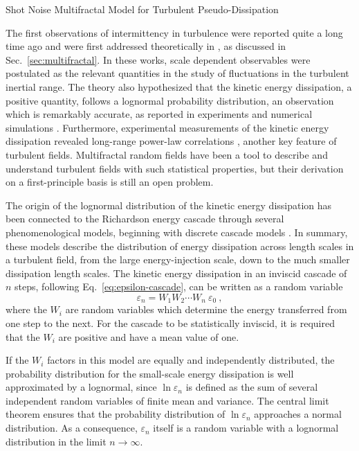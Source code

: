 \begin{chapter}{Shot Noise Multifractal Model for Turbulent Pseudo-Dissipation}
\label{chap:shotnoise}

The first observations of intermittency in turbulence were reported quite a long time ago \parencite{batchelor1949} and were first addressed theoretically in \textcite{kolmogorov1962refinement,obukhov1962}, as discussed in Sec.~\ref{sec:multifractal}. In these works, scale dependent observables were postulated as the relevant quantities in the study of fluctuations in the turbulent inertial range.
The theory also hypothesized that the kinetic energy dissipation, a positive quantity, follows a lognormal probability distribution, an observation which is remarkably accurate, as reported in experiments and numerical simulations \parencite{yeungpope1989}.
Furthermore, experimental measurements of the kinetic energy dissipation revealed long-range power-law correlations \parencite{gurvitch1963,pond1965}, another key feature of turbulent fields. Multifractal random fields have been a tool to describe and understand turbulent fields with such statistical properties, but their derivation on a first-principle basis is still an open problem.

The origin of the lognormal distribution of the kinetic energy dissipation has been connected to the Richardson energy cascade through several phenomenological models, beginning with discrete cascade models \parencite{novikov1964,yaglom1966,frisch1978}. In summary, these models describe the distribution of energy dissipation across length scales in a turbulent field, from the large energy-injection scale, down to the much smaller dissipation length scales.
The kinetic energy dissipation in an inviscid cascade of $n$ steps, following Eq.~\eqref{eq:epsilon-cascade}, can be written as a random variable
\begin{equation} \label{eq:discrete-cascade}
    \varepsilon_n = W_1 W_2 \cdots W_n \ \varepsilon_0 \ ,
\end{equation}
where the $W_i$ are random variables which determine the energy transferred from one step to the next. For the cascade to be statistically inviscid, it is required that the $W_i$ are positive and have a mean value of one.

If the $W_i$ factors in this model are equally and independently distributed, the probability distribution for the small-scale energy dissipation is well approximated by a lognormal, since $\ln \varepsilon_n$ is defined as the sum of several independent random variables of finite mean and variance.
The central limit theorem ensures that the probability distribution of $\ln \varepsilon_n$ approaches a normal distribution. As a consequence, $\varepsilon_n$ itself is a random variable with a lognormal distribution in the limit $n \to \infty$.


\end{chapter}
